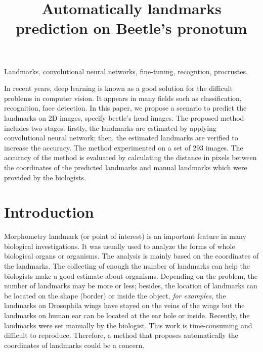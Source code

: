 \documentclass[10pt]{article}
\begin{document}
\noindent



\title{Automatically landmarks prediction on Beetle's pronotum}




\maketitle

\keywords
Landmarks, convolutional neural networks, fine-tuning, recogntion, procrustes.

\abstract
In recent years, deep learning is known as a good solution for the difficult problems in computer vision. It appears in many fields such as classification, recognition, face detection. In this paper, we propose a scenario to predict the landmarks on 2D images, specify beetle's head images. The proposed method includes two stages: firstly, the landmarks are estimated by applying convolutional neural network; then, the estimated landmarks are verified to increase the accuracy. The method experimented on a set of 293 images. The accuracy of the method is evaluated by calculating the distance in pixels between the coordinates of the predicted landmarks and manual landmarks which were provided by the biologists.

\section{Introduction}
Morphometry landmark (or point of interest) is an important feature in many biological investigations. It was usually used to analyze the forms of whole biological organs or organisms. The analysis is mainly based on the coordinates of the landmarks. The collecting of enough the number of landmarks can help the biologists make a good estimate about organisms. Depending on the problem, the number of landmarks may be more or less; besides, the location of landmarks can be located on the shape (border) or inside the object, \textit{for examples,} the landmarks on Drosophila wings have stayed on the veins of the wings but the landmarks on human ear can be located at the ear hole or inside. Recently, the landmarks were set manually by the biologist. This work is time-consuming and difficult to reproduce. Therefore, a method that proposes automatically the coordinates of landmarks could be a concern. 
\end{document}
